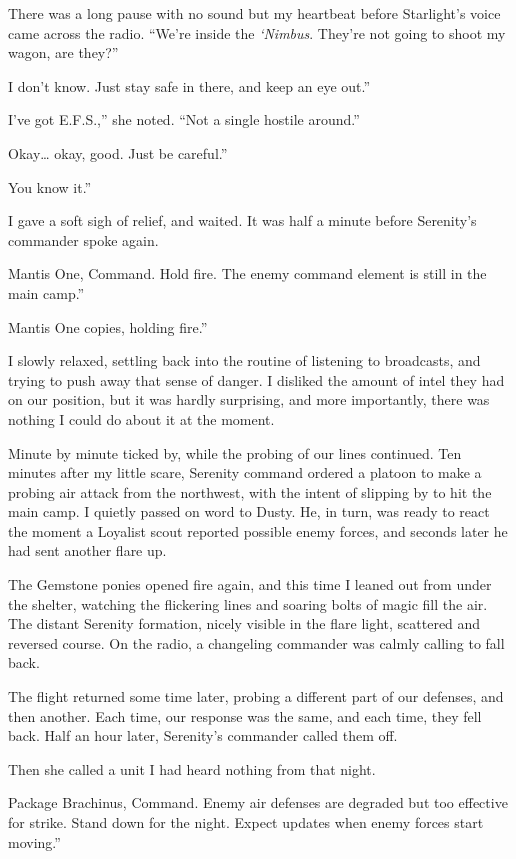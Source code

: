 There was a long pause with no sound but my heartbeat before Starlight’s voice came across the radio. “We’re inside the \textit{‘Nimbus}. They’re not going to shoot my wagon, are they?”

\leavevmode{}I don’t know. Just stay safe in there, and keep an eye out.”

\leavevmode{}I’ve got E.F.S.,” she noted. “Not a single hostile around.”

\leavevmode{}Okay… okay, good. Just be careful.”

\leavevmode{}You know it.”

I gave a soft sigh of relief, and waited. It was half a minute before Serenity’s commander spoke again.

\leavevmode{}Mantis One, Command. Hold fire. The enemy command element is still in the main camp.”

\leavevmode{}Mantis One copies, holding fire.”

I slowly relaxed, settling back into the routine of listening to broadcasts, and trying to push away that sense of danger. I disliked the amount of intel they had on our position, but it was hardly surprising, and more importantly, there was nothing I could do about it at the moment.

Minute by minute ticked by, while the probing of our lines continued. Ten minutes after my little scare, Serenity command ordered a platoon to make a probing air attack from the northwest, with the intent of slipping by to hit the main camp. I quietly passed on word to Dusty. He, in turn, was ready to react the moment a Loyalist scout reported possible enemy forces, and seconds later he had sent another flare up.

The Gemstone ponies opened fire again, and this time I leaned out from under the shelter, watching the flickering lines and soaring bolts of magic fill the air. The distant Serenity formation, nicely visible in the flare light, scattered and reversed course. On the radio, a changeling commander was calmly calling to fall back.

The flight returned some time later, probing a different part of our defenses, and then another. Each time, our response was the same, and each time, they fell back. Half an hour later, Serenity’s commander called them off.

Then she called a unit I had heard nothing from that night.

\leavevmode{}Package Brachinus, Command. Enemy air defenses are degraded but too effective for strike. Stand down for the night. Expect updates when enemy forces start moving.”

